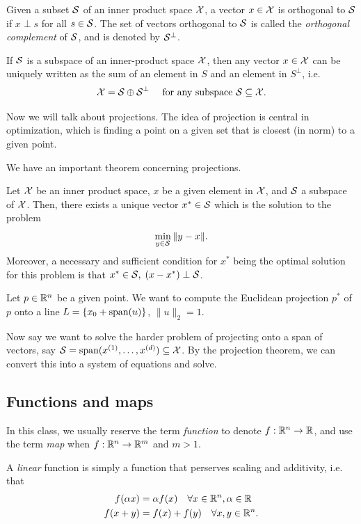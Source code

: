 \documentclass[11 pt]{scrartcl}
\begin{document}
Given a subset $\mathcal S$ of an inner product space $\mathcal X$, a vector $x\in \mathcal X$ is orthogonal to $\mathcal S$ if $x\perp s$ for all $s\in \mathcal S$. 
The set of vectors orthogonal to $\mathcal S$ is called the \emph{orthogonal complement} of $\mathcal S$, and is denoted by $\mathcal S^\perp$. 

\begin{theorem}
    If $\mathcal S$ is a subspace of an inner-product space $\mathcal X$, then any vector $x\in \mathcal X$ can be uniquely written as the sum of an element in $S$ and an element in $S^\perp$, i.e. 
    \[ \mathcal X = \mathcal S \oplus \mathcal S^\perp \quad \text{ for any subspace } \mathcal S\subseteq \mathcal X.\]
\end{theorem}

Now we will talk about projections. 
The idea of projection is central in optimization, which is finding a point on a given set that is closest (in norm) to a given point. 


We have an important theorem concerning projections.
\begin{theorem}
    \label{thm:proj}
    Let $\mathcal X$ be an inner product space, $x$ be a given element in $\mathcal X$, and $\mathcal S$ a subspace of $\mathcal X$. 
    Then, there exists a unique vector $x^*\in \mathcal S$ which is the solution to the problem 
    \[ \min_{y\in\mathcal S} \|y-x\|.\] 
    Moreover, a necessary and sufficient condition for $x^*$ being the optimal solution for this problem is that $x^*\in \mathcal S,\; (x-x^*)\perp \mathcal S$. 
\end{theorem}

Let $p\in \mathbb R^n$ be a given point. 
We want to compute the Euclidean projection $p^*$ of $p$ onto a line $L = \{x_0 + \text{span}(u)\}$, $\|u\|_2 = 1$. 

Now say we want to solve the harder problem of projecting onto a span of vectors, say $\mathcal S = \text{span}(x^{(1)}, \dots, x^{(d)})\subseteq \mathcal X$. 
By the projection theorem, we can convert this into a system of equations and solve. 


\subsection{Functions and maps}
In this class, we usually reserve the term \emph{function} to denote $f: \mathbb R^n\to \mathbb R$, and use the term \emph{map} when $f: \mathbb R^n \to \mathbb R^m$ and $m > 1$.

A \emph{linear} function is simply a function that perserves scaling and additivity, i.e. that 
\begin{align*}
    f(\alpha x) &= \alpha f(x) \quad\forall x\in \mathbb R^n, \alpha\in\mathbb R \\ 
    f(x + y) &= f(x) + f(y) \quad\forall x,y\in \mathbb R^n.
\end{align*}
\end{document}
